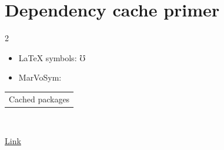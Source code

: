 \documentclass[letterpaper,11pt]{article}
\begin{document}
\section{Dependency cache primer}
\begin{multicols}{2}
  \begin{itemize}[leftmargin=*]
    \item \textcolor{BrickRed}{LaTeX symbols: $\mho$}
    \item MarVoSym: \Mobilefone
  \end{itemize}
\end{multicols}
\noindent\begin{tabularx}{\textwidth}{X}
  Cached packages
\end{tabularx}
\par
\faPhone\ \faEnvelope\ \faLinkedin\par
\href{https://example.test}{Link}
\end{document}
